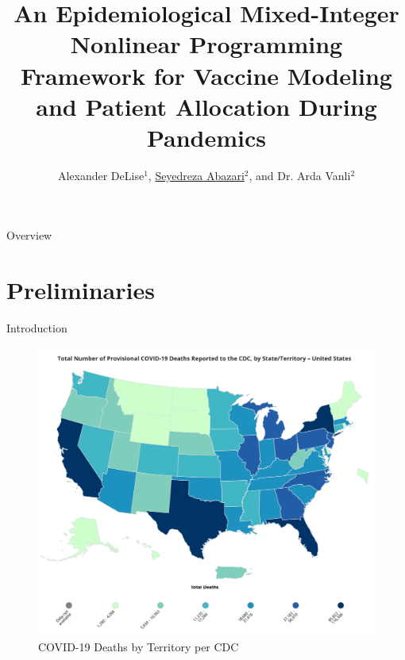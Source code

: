 \documentclass[aspectratio=169,xcolor=dvipsnames]{beamer}
\title{An Epidemiological Mixed-Integer Nonlinear Programming Framework for Vaccine Modeling and Patient Allocation During Pandemics}
\author{Alexander DeLise$^1$, \underline{Seyedreza Abazari$^2$}, and Dr. Arda Vanli$^2$}
\institute{$^1$Florida State University, $^2$FAMU-FSU College of Engineering} %
\begin{document}
\begin{frame}\titlepage\end{frame}

\begin{frame}{Overview}
    \tableofcontents
\end{frame}

\section{Preliminaries}

\begin{frame}{Introduction}
    \begin{minipage}[t]{0.48\textwidth}
        \begin{figure}
            \includegraphics[width=0.95\linewidth]{pics/usCovidDeaths.png}
            \caption{COVID-19 Deaths by Territory per CDC}

\end{figure}
\end{minipage}
\end{frame}
\end{document}
